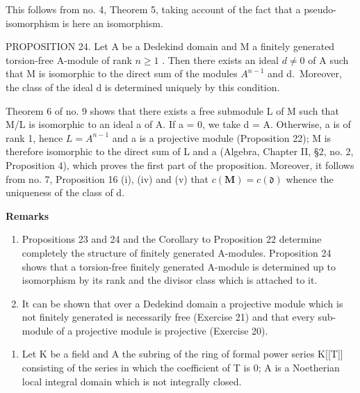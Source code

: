 This follows from no. 4, Theorem 5, taking account of the fact that a pseudo-isomorphism is here an isomorphism.

PROPOSITION 24. Let A be a Dedekind domain and M a finitely generated torsion-free A-module of rank \(n \geqslant 1\) . Then there exists an ideal \(d \neq 0\) of A such that M is isomorphic to the direct sum of the modules \(A^{n-1}\) and d.~Moreover, the class of the ideal d is determined uniquely by this condition.

Theorem 6 of no. 9 shows that there exists a free submodule L of M such that M/L is isomorphic to an ideal a of A. If a = 0, we take d = A. Otherwise, a is of rank 1, hence \(L = A^{n-1}\) and a is a projective module (Proposition 22); M is therefore isomorphic to the direct sum of L and a (Algebra, Chapter II, §2, no. 2, Proposition 4), which proves the first part of the proposition. Moreover, it follows from no. 7, Proposition 16 (i), (iv) and (v) that \(c(\mathbf{M}) = c(\mathfrak{d})\) whence the uniqueness of the class of d.

\textbf{Remarks}\par

\begin{enumerate}
\def\labelenumi{(\arabic{enumi})}
\item
  Propositions 23 and 24 and the Corollary to Proposition 22 determine completely the structure of finitely generated A-modules. Proposition 24 shows that a torsion-free finitely generated A-module is determined up to isomorphism by its rank and the divisor class which is attached to it.
\item
  It can be shown that over a Dedekind domain a projective module which is not finitely generated is necessarily free (Exercise 21) and that every sub-module of a projective module is projective (Exercise 20).
\end{enumerate}



\begin{enumerate}
\def\labelenumi{\arabic{enumi}.}
\tightlist
\item
  Let K be a field and A the subring of the ring of formal power series K{[}{[}T{]}{]} consisting of the series in which the coefficient of T is 0; A is a Noetherian local integral domain which is not integrally closed.
\end{enumerate}

